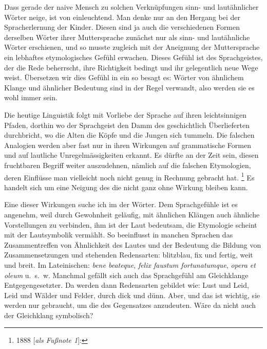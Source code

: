 {Dass gerade der naive Mensch zu solchen Verknüpfungen sinn- und lautähnlicher Wörter neige, ist von  einleuchtend. Man denke nur an den Hergang bei der Spracherlernung der Kinder. Diesen sind ja auch die verschiedenen Formen derselben Wörter ihrer Muttersprache zunächst nur als sinn- und lautähnliche Wörter erschienen, und so musste zugleich mit der Aneignung der Muttersprache ein lebhaftes etymologisches Gefühl erwachen. Dieses Gefühl ist  des  Sprachgeistes, der die Rede beherrscht, ihre Richtigkeit bedingt und ihr gelegentlich neue Wege weist. Übersetzen wir dies Gefühl in ein  so besagt es: Wörter von ähnlichem Klange und ähnlicher Bedeutung sind in der Regel verwandt, also werden sie es wohl immer sein.

Die heutige Linguistik folgt mit Vorliebe der Sprache auf ihren leichtsinnigen Pfaden, dorthin wo der Sprachgeist den Damm des geschichtlich Überlieferten durchbricht, wo die Alten die Köpfe  und die Jungen sich tummeln. Die falschen Analogien werden aber fast \label{fp.221} nur in ihren Wirkungen \label{sp.222} auf grammatische Formen und auf lautliche Unregelmässigkeiten erkannt. Es dürfte an der Zeit sein, diesen fruchtbaren Begriff weiter auszudehnen, nämlich auf die falschen Etymologien, deren Einflüsse man vielleicht noch nicht genug in Rechnung gebracht hat. \footnote{1888 [\textit{als Fußnote 1}]: } Es handelt sich um eine Neigung des  die nicht ganz ohne Wirkung bleiben kann.

Eine dieser Wirkungen suche ich im  der Wörter. Dem Sprachgefühle ist es angenehm, weil durch Gewohnheit geläufig, mit ähnlichen Klängen auch ähnliche Vorstellungen zu verbinden, ihm ist der Laut bedeutsam, die Etymologie scheint mit der Lautsymbolik vermählt. So beeinflusst in manchen Sprachen das Zusammentreffen von Ähnlichkeit des Lautes und der Bedeutung die \label{fp.29} Bildung von Zusammensetzungen und stehenden Redensarten: blitzblau,  fix und fertig, weit und breit. Im Lateinischen: \textit{bene beateque}, \textit{felix faustum fortunatumque}, \textit{opera et oleum} u.~s.~w. Manchmal gefällt sich auch das Sprachgefühl am Gleichklange Entgegengesetzter. Da werden dann Redensarten gebildet wie: Lust und Leid, Leid und  Wälder und Felder, durch dick und dünn. Aber, und das ist wichtig, sie werden nur gebraucht, um die  des Gegensatzes anzudeuten. Wäre da nicht auch der Gleichklang symbolisch?

}
